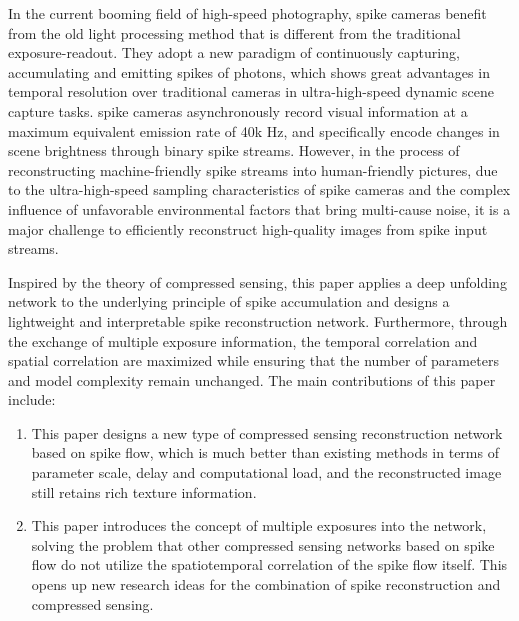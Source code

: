 \begin{abstract*}
  In the current booming field of high-speed photography, spike cameras benefit from the old light processing method that is different from the traditional exposure-readout. They adopt a new paradigm of continuously capturing, accumulating and emitting spikes of photons, which shows great advantages in temporal resolution over traditional cameras in ultra-high-speed dynamic scene capture tasks. spike cameras asynchronously record visual information at a maximum equivalent emission rate of 40k Hz, and specifically encode changes in scene brightness through binary spike streams. However, in the process of reconstructing machine-friendly spike streams into human-friendly pictures, due to the ultra-high-speed sampling characteristics of spike cameras and the complex influence of unfavorable environmental factors that bring multi-cause noise, it is a major challenge to efficiently reconstruct high-quality images from spike input streams.

Inspired by the theory of compressed sensing, this paper applies a deep unfolding network to the underlying principle of spike accumulation and designs a lightweight and interpretable spike reconstruction network. Furthermore, through the exchange of multiple exposure information, the temporal correlation and spatial correlation are maximized while ensuring that the number of parameters and model complexity remain unchanged. The main contributions of this paper include:
\begin{enumerate}
  \item This paper designs a new type of compressed sensing reconstruction network based on spike flow, which is much better than existing methods in terms of parameter scale, delay and computational load, and the reconstructed image still retains rich texture information.
  \item This paper introduces the concept of multiple exposures into the network, solving the problem that other compressed sensing networks based on spike flow do not utilize the spatiotemporal correlation of the spike flow itself. This opens up new research ideas for the combination of spike reconstruction and compressed sensing.
\end{enumerate}

\end{abstract*}
